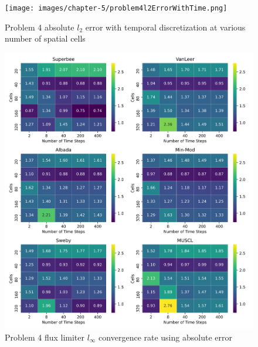 \begin{figure}[p]
    \centering
    \texttt{[image: images/chapter-5/problem4l2ErrorWithTime.png]}
    \caption{Problem 4 absolute $l_{2}$ error with temporal discretization at various number of spatial cells}
    \label{fig:problem4_l2error_time_results}
\end{figure}

\clearpage

\begin{figure}[p]
    \centering
    \includegraphics[width=6in]{images/chapter-5/problem4linftyFluxLimiterConvergenceRate.png}
    \caption{Problem 4 flux limiter $l_{\infty}$ convergence rate using absolute error}
    \label{fig:problem4_linferror_fluxlimiter_convergence_rate}
\end{figure}

\clearpage

